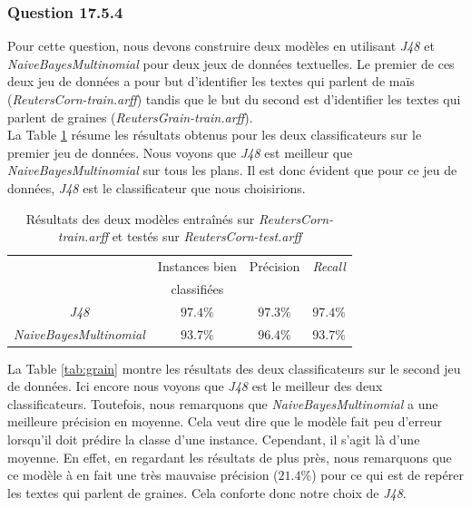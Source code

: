 \documentclass[10pt,a4paper]{article}
\begin{document}
			\subsubsection*{Question 17.5.4}
			
			  Pour cette question, nous devons construire deux modèles en utilisant \textit{J48} et \textit{NaiveBayesMultinomial} pour deux jeux de données textuelles. Le premier de ces deux jeu de données a pour but d'identifier les textes qui parlent de maïs (\textit{ReutersCorn-train.arff}) tandis que le but du second est d'identifier les textes qui parlent de graines (\textit{ReutersGrain-train.arff}).\\
			  
			  La Table \ref{tab:corn} résume les résultats obtenus pour les deux classificateurs sur le premier jeu de données. Nous voyons que \textit{J48} est meilleur que \textit{NaiveBayesMultinomial} sur tous les plans. Il est donc évident que pour ce jeu de données, \textit{J48} est le classificateur que nous choisirions.\\ 
			  
			  \begin{table}[h]
			  	\centering
			  	\caption{Résultats des deux modèles entraînés sur \textit{ReutersCorn-train.arff} et testés sur \textit{ReutersCorn-test.arff}}
			  	\label{tab:corn}
		  		\begin{tabular}{|c|c|c|c|}
		  			\hline
		  			&Instances bien  & Précision & \textit{Recall}\\
		  			& classifiées  &  & \\ 
		  			\hline
		  			\textit{J48} & $97.4 \%$ & $97.3\%$ & $97.4\%$ \\
		  			\hline
		  			\textit{NaiveBayesMultinomial}& $93.7\%$ & $96.4\%$ & $93.7\%$ \\
		  			\hline
		  		\end{tabular}
			  \end{table}
			  
			  La Table \ref{tab:grain} montre les résultats des deux classificateurs sur le second jeu de données. Ici encore nous voyons que \textit{J48} est le meilleur des deux classificateurs. Toutefois, nous remarquons que \textit{NaiveBayesMultinomial} a une meilleure précision en moyenne. Cela veut dire que le modèle fait peu d'erreur lorsqu'il doit prédire la classe d'une instance. Cependant, il s'agit là d'une moyenne. En effet, en regardant les résultats de plus près, nous remarquons que ce modèle à en fait une très mauvaise précision ($21.4 \%$) pour ce qui est de repérer les textes qui parlent de graines. Cela conforte donc notre choix de \textit{J48}.
			  
\end{document}

